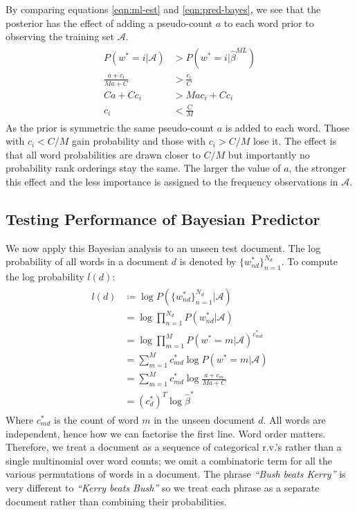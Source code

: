 \documentclass[]{article}
\newcommand{\Acal}{\mathcal{A}}
\newcommand{\betaml}{\hat{\beta}^{ML}}
\begin{document}
%
By comparing equations \ref{eqn:ml-est} and \ref{eqn:pred-bayes}, we see that the posterior has the effect of adding a pseudo-count $a$ to each word prior to observing the training set $\Acal$.
%
\begin{align}
\begin{split}
	P(w^*=i | \Acal) &> P(w^*=i | \betaml) \\
	\frac{a + c_i}{Ma + C} &> \frac{c_i}{C} \\
	Ca + Cc_i &> Mac_i + Cc_i \\
	c_i &< \frac{C}{M}
\end{split}
\end{align}
%
As the prior is symmetric the same pseudo-count $a$ is added to each word. Those with $c_i < C/M$ gain probability and those with $c_i > C/M$ lose it. The effect is that all word probabilities are drawn closer to $C/M$ but importantly no probability rank orderings stay the same. The larger the value of $a$, the stronger this effect and the less importance is assigned to the frequency observations in $\Acal$.

\clearpage
\subsection{Testing Performance of Bayesian Predictor}

We now apply this Bayesian analysis to an unseen test document. The log probability of all words in a document $d$ is denoted by $\{w^*_{nd}\}_{n=1}^{N_d}$. To compute the log probability $l(d)$:
%
\begin{align}
\begin{split}
	l(d) &\coloneqq \log P(\{w^*_{nd}\}_{n=1}^{N_d} | \Acal) \\
	&= \log \prod_{n=1}^{N_d} P(w^*_{nd} | \Acal) \\
	&= \log \prod_{m = 1}^{M} P(w^*=m | \Acal)^{c^*_{md}} \\
	&= \sum_{m=1}^{M} c^*_{md} \log P(w^* = m | \Acal) \\
	&= \sum_{m=1}^{M} c^*_{md} \log \frac{a+c_m}{Ma+C} \\
	&= (c^*_d)^T \log \hat{\beta}^{*}
\end{split}
\label{eqn:test-doc-prob}
\end{align}
%
Where $c^*_{md}$ is the count of word $m$ in the unseen document $d$. All words are independent, hence how we can factorise the first line. Word order matters. Therefore, we treat a document as a sequence of categorical r.v.'s rather than a single multinomial over word counts; we omit a combinatoric term for all the various permutations of words in a document. The phrase \textit{``Bush beats Kerry''} is very different to \textit{``Kerry beats Bush''} so we treat each phrase as a separate document rather than combining their probabilities.
\end{document}
